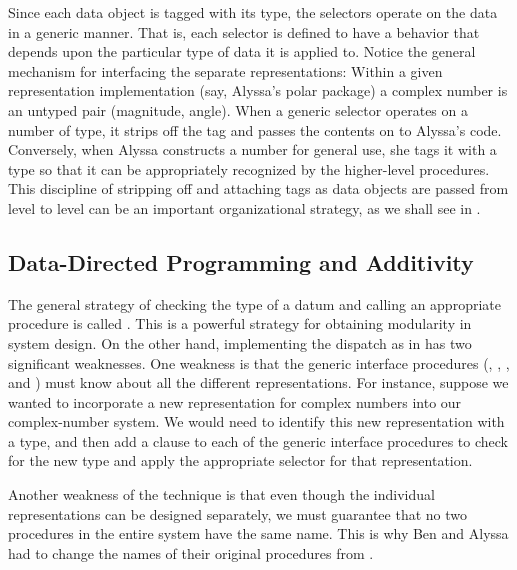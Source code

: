 Since each data object is tagged with its type, the selectors operate on the
data in a generic manner.  That is, each selector is defined to have a behavior
that depends upon the particular type of data it is applied to.  Notice the
general mechanism for interfacing the separate representations: Within a given
representation implementation (say, Alyssa's polar package) a complex number is
an untyped pair (magnitude, angle).  When a generic selector operates on a
number of  type, it strips off the tag and passes the contents on
to Alyssa's code.  Conversely, when Alyssa constructs a number for general use,
she tags it with a type so that it can be appropriately recognized by the
higher-level procedures.  This discipline of stripping off and attaching tags
as data objects are passed from level to level can be an important
organizational strategy, as we shall see in .

\subsection{Data-Directed Programming and Additivity}
\label{Section 2.4.3}

The general strategy of checking the type of a datum and calling an appropriate
procedure is called .  This is a powerful strategy
for obtaining modularity in system design.  On the other hand, implementing the
dispatch as in  has two significant weaknesses.  One
weakness is that the generic interface procedures (,
, , and ) must know about all the
different representations.  For instance, suppose we wanted to incorporate a
new representation for complex numbers into our complex-number system.  We
would need to identify this new representation with a type, and then add a
clause to each of the generic interface procedures to check for the new type
and apply the appropriate selector for that representation.

Another weakness of the technique is that even though the individual
representations can be designed separately, we must guarantee that no two
procedures in the entire system have the same name.  This is why Ben and Alyssa
had to change the names of their original procedures from
.

